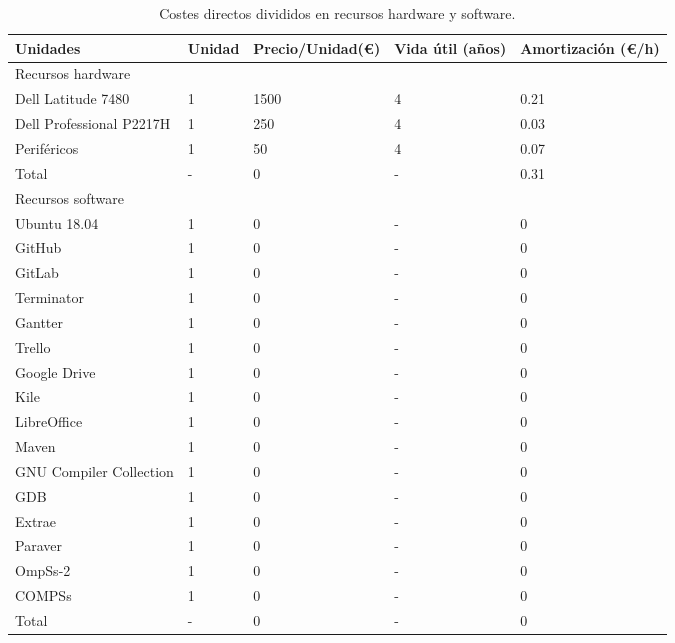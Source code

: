 \begin{table}[H]
\centering
 \begin{tabular}{| l | l | l | l | l |}
    \hline
    Unidades & Unidad & Precio/Unidad(\euro) & Vida útil (años) & Amortización (\euro/h) \\
    \hline
    \cline{1-1}
    \rowcolor{gray!50}
    Recursos hardware \\
    \hline
    Dell Latitude 7480          & 1 & 1500  & 4 & 0.21\\
    \hline 
    Dell Professional P2217H    & 1 & 250   & 4 & 0.03\\
    \hline
    Periféricos                 & 1 & 50    & 4 & 0.07\\
    \hline
    \rowcolor{gray!50}
    Total                       & - & 0     & - & 0.31\\
    \hline
    \cline{1-1}
    \rowcolor{gray!50}
    Recursos software \\
    \hline
    Ubuntu 18.04                & 1 & 0     & - & 0\\
    \hline
    GitHub                      & 1 & 0     & - & 0\\
    \hline
    GitLab                      & 1 & 0     & - & 0\\
    \hline
    Terminator                  & 1 & 0     & - & 0\\
    \hline
    Gantter                     & 1 & 0     & - & 0\\
    \hline
    Trello                      & 1 & 0     & - & 0\\
    \hline
    Google Drive                & 1 & 0     & - & 0\\
    \hline
    Kile                        & 1 & 0     & - & 0\\
    \hline
    LibreOffice                 & 1 & 0     & - & 0\\
    \hline
    Maven                       & 1 & 0     & - & 0\\
    \hline
    GNU Compiler Collection     & 1 & 0     & - & 0\\
    \hline
    GDB                         & 1 & 0     & - & 0\\
    \hline
    Extrae                      & 1 & 0     & - & 0\\
    \hline
    Paraver                     & 1 & 0     & - & 0\\
    \hline
    OmpSs-2                     & 1 & 0     & - & 0\\
    \hline
    COMPSs                      & 1 & 0     & - & 0\\
    \hline
    \rowcolor{gray!50}
    Total                       & - & 0     & - & 0\\
    \hline
 \end{tabular}
\caption{Costes directos divididos en recursos hardware y software.}
\end{table}

